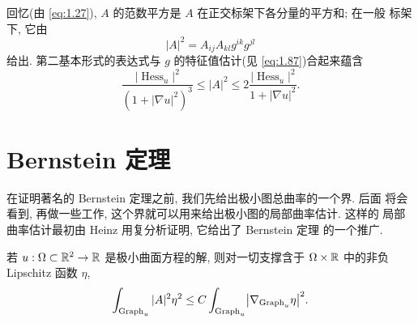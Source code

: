 回忆(由 \eqref{eq:1.27}), $A$ 的范数平方是 $A$ 在正交标架下各分量的平方和; 在一般
标架下, 它由
\begin{equation}
|A|^2=A_{ij}A_{kl}g^{ik}g^{jl}
\label{eq:1.93}
\end{equation}
给出. 第二基本形式的表达式与 $g$ 的特征值估计(见 \eqref{eq:1.87})合起来蕴含
\begin{equation}
\frac{\bigl|\operatorname{Hess}_u\bigr|^{2}}{(1+|\nabla u|^2)^{3}}
 \leq|A|^{2}\leq
 2\frac{\bigl|\operatorname{Hess}_u\bigr|^{2}}{1+|\nabla u|^2}.
\label{eq:1.94}
\end{equation}

\section{Bernstein 定理}
\label{sec:1.5}

在证明著名的 Bernstein 定理之前, 我们先给出极小图总曲率的一个界. 后面
将会看到, 再做一些工作, 这个界就可以用来给出极小图的局部曲率估计. 这样的
局部曲率估计最初由 Heinz \cite{He} 用复分析证明, 它给出了 Bernstein 定理
的一个推广.

\begin{lemma}
\label{lem:1.19}
若 $u:\Omega\subset\mathbb{R}^2\to\mathbb{R}$ 是极小曲面方程的解, 则对一切支撑含于
$\Omega\times\mathbb{R}$ 中的非负 Lipschitz 函数 $\eta$,
\begin{equation}
\int_{\operatorname{Graph}_u}|A|^{2}\eta^{2}
 \leq C\int_{\operatorname{Graph}_u}\bigl|\nabla_{\operatorname{Graph}_u}\eta\bigr|^{2}.
\label{eq:1.95}
\end{equation}
\end{lemma}


